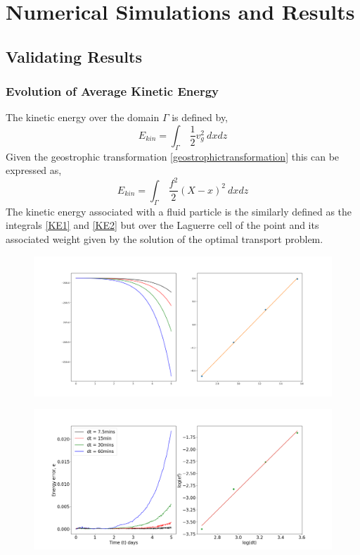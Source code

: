 \chapter{Numerical Simulations and Results \label{results}}

\section{Validating Results}
\subsection{Evolution of Average Kinetic Energy}
The kinetic energy over the domain $\Gamma$ is defined by,
\begin{equation}
	E_{kin} = \int_\Gamma \ \frac{1}{2}v_g^2 \ dxdz
	\label{KE1}
\end{equation}
Given the geostrophic transformation \ref{geostrophictransformation} this can be expressed as,
\begin{equation}
E_{kin} = \int_\Gamma \ \frac{f^2}{2}(X-x)^2 \ dxdz
\label{KE2}
\end{equation}
The kinetic energy associated with a fluid particle is the similarly defined as the integrals \ref{KE1} and \ref{KE2} but over the Laguerre cell of the point and its associated weight given by the solution of the optimal transport problem.
\begin{figure}
	\centering
	\includegraphics[width=\linewidth]{evaluation/euler_5D_energy}
	\caption{}
	\label{fig:euler5denergy}
\end{figure}
\begin{figure}
	\centering
	\includegraphics[width=\linewidth]{evaluation/energy_5D_heun}
	\caption{}
	\label{fig:euler5denergy}
\end{figure}
